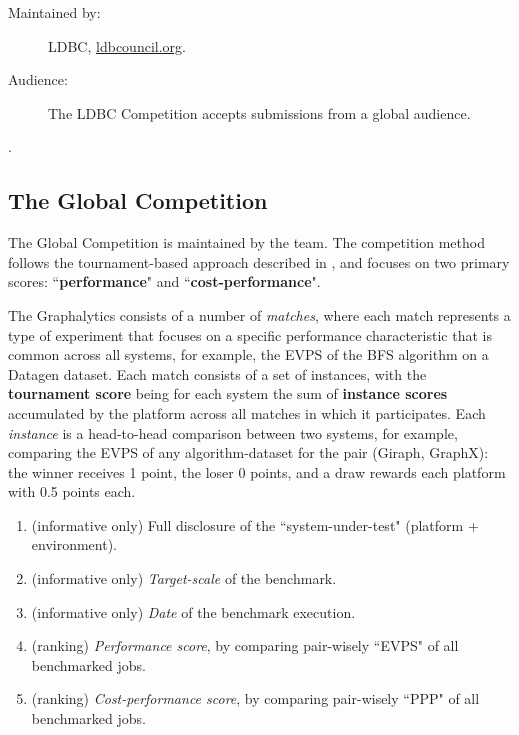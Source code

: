 \begin{description}
    \item[Maintained by:] LDBC, \url{ldbcouncil.org}.
    \item[Audience:] The LDBC Competition accepts submissions from a global audience.
\end{description} 

 .



\subsection{The Global \toolname{} Competition} \label{sec:competitions:graphalytics}
The Global \toolname{} Competition is maintained by the \toolname team. The competition method follows the tournament-based approach described in , and focuses on two primary scores: ``{\bf performance}" and ``{\bf cost-performance}".

The Graphalytics consists of a number of {\it matches}, where each match represents a type of experiment that focuses on a specific performance characteristic that is common across all systems, for example, the EVPS of the BFS algorithm on a Datagen dataset. Each match consists of a set of instances, with the {\bf tournament score} being for each system the sum of {\bf instance scores} accumulated by the platform across all matches in which it participates.  Each {\it instance} is a head-to-head comparison between two systems, for example, comparing the EVPS of any algorithm-dataset for the pair (Giraph, GraphX): the winner receives 1 point, the loser 0 points, and a draw rewards each platform with 0.5 points each.


\begin{enumerate}
    \item (informative only) Full disclosure of the ``system-under-test" (platform + environment).
    \item (informative only) {\it Target-scale} of the benchmark.
    \item (informative only) {\it Date} of the benchmark execution.
	\item (ranking) {\it Performance score}, by comparing pair-wisely ``EVPS" of all benchmarked jobs.
	\item (ranking) {\it Cost-performance score}, by comparing pair-wisely  ``PPP" of all benchmarked jobs.
\end{enumerate}


